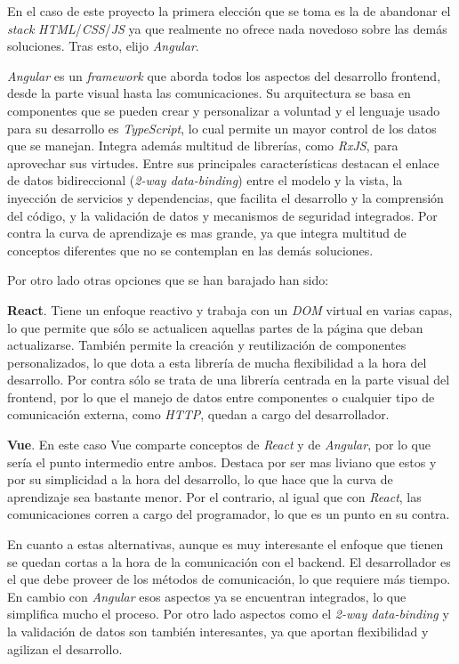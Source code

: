 En el caso de este proyecto la primera elección que se toma es la de abandonar el \textit{stack} \textit{HTML}/\textit{CSS}/\textit{JS} ya que realmente no ofrece nada novedoso sobre las demás soluciones. Tras esto, elijo \textit{Angular}.

\textit{Angular} es un \textit{framework} que aborda todos los aspectos del desarrollo frontend, desde la parte visual hasta las comunicaciones. Su arquitectura se basa en componentes que se pueden crear y personalizar a voluntad y el lenguaje usado para su desarrollo es \textit{TypeScript}, lo cual permite un mayor control de los datos que se manejan. Integra además multitud de librerías, como \textit{RxJS}, para aprovechar sus virtudes. Entre sus principales características destacan el enlace de datos bidireccional (\textit{2-way data-binding}) entre el modelo y la vista, la inyección de servicios y dependencias, que facilita el desarrollo y la comprensión del código, y la validación de datos y mecanismos de seguridad integrados. Por contra la curva de aprendizaje es mas grande, ya que integra multitud de conceptos diferentes que no se contemplan en las demás soluciones.

\bigskip
Por otro lado otras opciones que se han barajado han sido:

\textbf{React}. Tiene un enfoque reactivo y trabaja con un \textit{DOM} virtual en varias capas, lo que permite que sólo se actualicen aquellas partes de la página que deban actualizarse. También permite la creación y reutilización de componentes personalizados, lo que dota a esta librería de mucha flexibilidad a la hora del desarrollo. Por contra sólo se trata de una librería centrada en la parte visual del frontend, por lo que el manejo de datos entre componentes o cualquier tipo de comunicación externa, como \textit{HTTP}, quedan a cargo del desarrollador.

\textbf{Vue}. En este caso Vue comparte conceptos de \textit{React} y de \textit{Angular}, por lo que sería el punto intermedio entre ambos. Destaca por ser mas liviano que estos y por su simplicidad a la hora del desarrollo, lo que hace que la curva de aprendizaje sea bastante menor. Por el contrario, al igual que con \textit{React}, las comunicaciones corren a cargo del programador, lo que es un punto en su contra.

\bigskip
En cuanto a estas alternativas, aunque es muy interesante el enfoque que tienen se quedan cortas a la hora de la comunicación con el backend. El desarrollador es el que debe proveer de los métodos de comunicación, lo que requiere más tiempo. En cambio con \textit{Angular} esos aspectos ya se encuentran integrados, lo que simplifica mucho el proceso. Por otro lado aspectos como el \textit{2-way data-binding} y la validación de datos son también interesantes, ya que aportan flexibilidad y agilizan el desarrollo.

